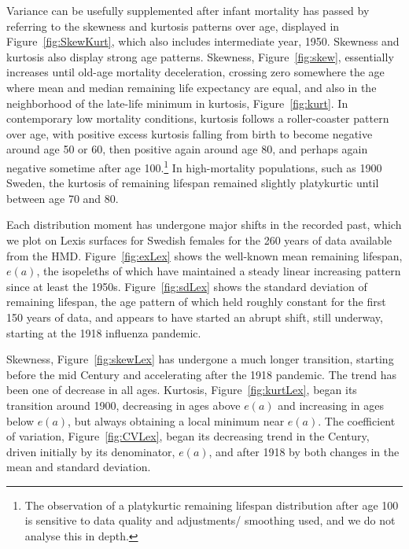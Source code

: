 \documentclass{article}
\begin{document}
Variance can be usefully supplemented after infant mortality
has passed by referring to the skewness and kurtosis patterns over age,
displayed in Figure~\ref{fig:SkewKurt}, which also includes intermediate year,
1950. Skewness and kurtosis also display strong age patterns. Skewness,
Figure~\ref{fig:skew}, essentially increases until old-age mortality
deceleration, crossing zero somewhere the age where mean and median remaining
life expectancy are equal, and also in the neighborhood of the late-life minimum
in kurtosis, Figure~\ref{fig:kurt}. In contemporary low mortality conditions,
kurtosis follows a roller-coaster pattern over age, with positive excess
kurtosis falling from birth to become negative around age 50 or 60, then
positive again around age 80, and perhaps again negative sometime after age
100.\footnote{The observation of a platykurtic remaining lifespan distribution
after age 100 is sensitive to data quality and adjustments/ smoothing
used, and we do not analyse this in depth.} In high-mortality populations, such
as 1900 Sweden, the kurtosis of remaining lifespan remained slightly platykurtic
until between age 70 and 80.

Each distribution moment has undergone major shifts in the recorded past, which
we plot on Lexis surfaces for Swedish females for the 260 years of data
available from the HMD. Figure~\ref{fig:exLex} shows the well-known mean
remaining lifespan, $e(a)$, the isopeleths of which have maintained a steady
linear increasing pattern since at least the 1950s. Figure~\ref{fig:sdLex} shows
the standard deviation of remaining lifespan, the age pattern of which held roughly
constant for the first 150 years of data, and appears to have started an
abrupt shift, still underway, starting at the 1918 influenza pandemic.

Skewness, Figure~\ref{fig:skewLex} has undergone a much longer
transition, starting before the mid  Century and accelerating after the 1918
pandemic. The trend has been one of decrease in all ages. Kurtosis,
Figure~\ref{fig:kurtLex}, began its transition around 1900, decreasing in ages
above $e(a)$ and increasing in ages below $e(a)$, but always obtaining a
local minimum near $e(a)$.
The coefficient of variation, Figure~\ref{fig:CVLex}, began its decreasing trend
in the  Century, driven initially by its denominator, $e(a)$, and after 1918 by
both changes in the mean and standard deviation.
\end{document}
